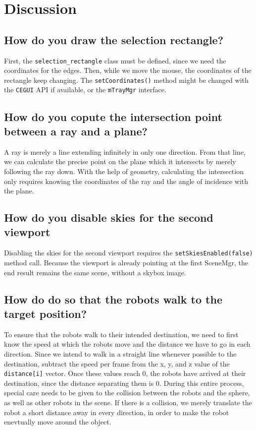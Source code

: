 \documentclass{article}
\begin{document}
\section{Discussion}
\subsection{How do you draw the selection rectangle?}
First, the \texttt{selection\_rectangle} class must be defined, since we need the coordinates for the edges. Then, while
we move the mouse, the coordinates of the rectangle keep changing. The \texttt{setCoordinates()} method might be changed
with the \texttt{CEGUI} API if available, or the \texttt{mTrayMgr} interface.

\subsection{How do you copute the intersection point between  a ray and a plane?}
A ray is merely a line extending infinitely in only one direction. From that line, we can calculate the precise point
on the plane which it intersects by merely following the ray down. With the help of geometry, calculating the intersection
only requires knowing the coordinates of the ray and the angle of incidence with the plane.

\subsection{How do you disable skies for the second viewport}
Disabling the skies for the second viewport requires the \texttt{setSkiesEnabled(false)} method call. Because the viewport
is already pointing at the first SceneMgr, the end result remains the same scene, without a skybox image.

\subsection{How do do so that the robots walk to the target position?}
To ensure that the robots walk to their intended destination, we need to first know the speed at which the robots move and
the distance we have to go in each direction. Since we intend to walk in a straight line whenever possible to the 
destination, subtract the speed per frame from the x, y, and z value of the \texttt{distance[i]} vector. Once these values
reach 0, the robots have arrived at their destination, since the distance separating them is 0. During this entire
process, special care needs to be given to the collision between the robots and the sphere, as well as other robots in 
the scene. If there is a collision, we merely translate the robot a short distance away in every direction, in order to 
make the robot enevtually move around the object.
\end{document}
